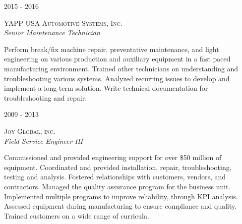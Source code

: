 \documentclass[10pt]{article} %
\begin{document}
\begin{minipage}[t]{0.5\textwidth}

{\raggedleft\textsc{2015 - 2016}\par}

{\raggedright\large\textsc{YAPP USA Automotive Systems, Inc.}\\
\textit{Senior Maintenance Technician}\\[5pt]}
\normalsize{Perform break/fix machine repair, preventative maintenance, and light engineering on various production and auxiliary equipment in a fast paced manufacturing environment. Trained other technicians on understanding and troubleshooting various systems. Analyzed recurring issues to develop and implement a long term solution. Write technical documentation for troubleshooting and repair.} 
\smallskip





{\raggedleft\textsc{2009 - 2013}\par}

{\raggedright\large\textsc{Joy Global, inc.}\\
\textit{Field Service Engineer III}\\[5pt]}

\normalsize{Commissioned and provided engineering support for over \$50 million of equipment. Coordinated and provided installation, repair, troubleshooting, testing and analysis. Fostered relationships with customers, vendors, and contractors. Managed the quality assurance program for the business unit. Implemented multiple programs to improve reliability, through KPI analysis. Assessed equipment during manufacturing to ensure compliance and quality. Trained customers on a wide range of curricula.}
\smallskip


\end{minipage}
\end{document}
